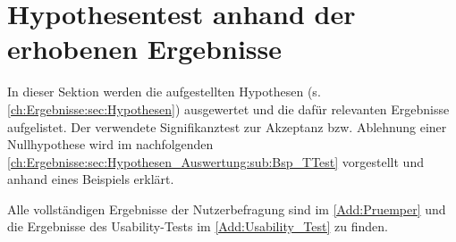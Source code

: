 \section{Hypothesentest anhand der erhobenen Ergebnisse}
\label{ch:Ergebnisse:sec:Hypothesen_Auswertung}

\noindent
In dieser Sektion werden die aufgestellten Hypothesen (s. \autoref{ch:Ergebnisse:sec:Hypothesen}) ausgewertet und die dafür relevanten Ergebnisse aufgelistet.
Der verwendete Signifikanztest zur Akzeptanz bzw. Ablehnung einer Nullhypothese wird im nachfolgenden \autoref{ch:Ergebnisse:sec:Hypothesen_Auswertung:sub:Bsp_TTest} vorgestellt und anhand eines Beispiels erklärt.

Alle vollständigen Ergebnisse der Nutzerbefragung sind im \autoref{Add:Pruemper} und die Ergebnisse des Usability-Tests im \autoref{Add:Usability_Test} zu finden.






